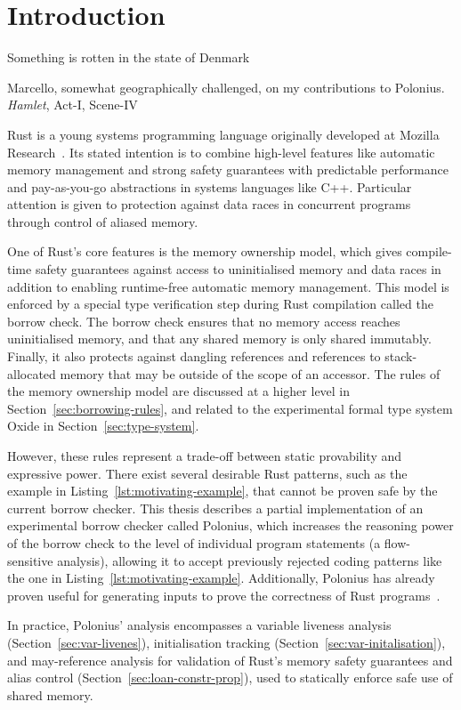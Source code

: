 \documentclass[11pt,a4paper,twoside,openany]{report}
\begin{document}
\chapter{Introduction}
\epigraph{Something is rotten in the state of Denmark}%
{Marcello, somewhat geographically challenged, on my contributions to Polonius.
  \textit{Hamlet}, Act-I, Scene-IV}
Rust is a young systems programming language originally developed at Mozilla
Research~\cite{matsakis_rust_2014}. Its stated intention is to combine
high-level features like automatic memory management and strong safety
guarantees with predictable performance and pay-as-you-go abstractions in
systems languages like C++. Particular attention is given to protection against
data races in concurrent programs through control of aliased memory.

One of Rust's core features is the memory ownership model, which gives
compile-time safety guarantees against access to uninitialised memory and data
races in addition to enabling runtime-free automatic memory management. This
model is enforced by a special type verification step during Rust compilation
called the borrow check. The borrow check ensures that no memory access reaches
uninitialised memory, and that any shared memory is only shared immutably.
Finally, it also protects against dangling references and references to
stack-allocated memory that may be outside of the scope of an accessor. The
rules of the memory ownership model are discussed at a higher level in
Section~\ref{sec:borrowing-rules}, and related to the experimental formal type
system Oxide in Section~\ref{sec:type-system}.

However, these rules represent a trade-off between static provability and
expressive power. There exist several desirable Rust patterns, such as the
example in Listing~\ref{lst:motivating-example}, that cannot be proven safe by
the current borrow checker. This thesis describes a partial implementation of an
experimental borrow checker called Polonius, which increases the reasoning power
of the borrow check to the level of individual program statements (a
flow-sensitive analysis), allowing it to accept previously rejected coding
patterns like the one in Listing~\ref{lst:motivating-example}. Additionally,
Polonius has already proven useful for generating inputs to prove the
correctness of Rust programs~\cite{Astrauskas:2019:LRT:3366395.3360573}.

In practice, Polonius' analysis encompasses a variable liveness analysis
(Section~\ref{sec:var-livenes}), initialisation tracking
(Section~\ref{sec:var-initalisation}), and may-reference analysis for validation
of Rust's memory safety guarantees and alias control
(Section~\ref{sec:loan-constr-prop}), used to statically enforce safe use of
shared memory.
\end{document}
